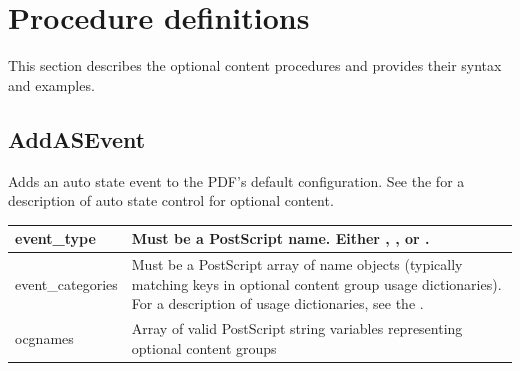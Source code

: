\documentclass[letterpaper,12pt,english,openany,oneside]{sphinxmanual}
\begin{document}
\section{Procedure definitions}
\label{\detokenize{pdfmark_OC_Interface:procedure-definitions}}
This section describes the optional content procedures and provides their syntax and examples.


\subsection{AddASEvent}
\label{\detokenize{pdfmark_OC_Interface:addasevent}}
Adds an auto state event to the PDF’s default configuration. See the  for a description of auto state control for optional content.


\begin{sphinxVerbatim}[commandchars=\\\{\}]
   
\end{sphinxVerbatim}



\begin{savenotes}\sphinxattablestart
\centering
\begin{tabulary}{\linewidth}[t]{|T|T|}
\hline

event\_type
&
Must be a PostScript name. Either  ,  , or  .
\\
\hline
event\_categories
&
Must be a PostScript array of name objects (typically matching keys in optional content group usage dictionaries). For a description of usage dictionaries, see the  .
\\
\hline
ocgnames
&
Array of valid PostScript string variables representing optional content groups
\\
\hline
\end{tabulary}
\par
\sphinxattableend\end{savenotes}


\begin{sphinxVerbatim}[commandchars=\\\{\}]
 \PYG{p}{[}\PYG{p}{]} \PYG{p}{[}     \PYG{p}{]} 
\end{sphinxVerbatim}
\end{document}
